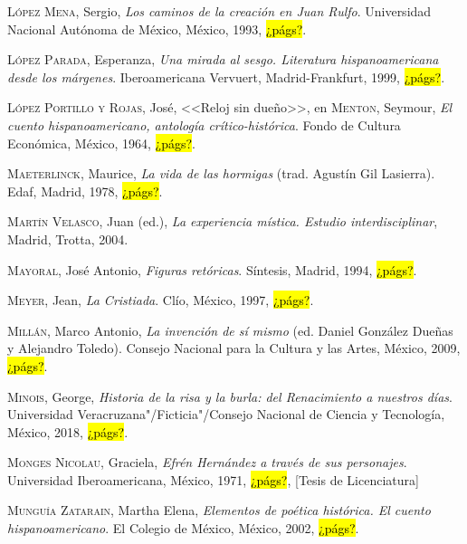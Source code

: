 \documentclass[14pt,twoside,final]{extbook} %
\begin{document}
\textsc{López Mena}, Sergio, \emph{Los caminos de la creación en Juan Rulfo}. Universidad Nacional Autónoma de México, México, 1993, \hl{¿págs?}.\label{bib:lopezmena1993}

\textsc{López Parada}, Esperanza, \emph{Una mirada al sesgo. Literatura hispanoamericana desde los márgenes}. Iberoamericana Vervuert, Madrid-Frankfurt, 1999, \hl{¿págs?}.\label{bib:lopezparada1999}

\textsc{López Portillo y Rojas}, José, <<Reloj sin dueño>>, en \textsc{Menton}, Seymour, \emph{El cuento hispanoamericano, antología crítico-histórica}. Fondo de Cultura Económica, México, 1964, \hl{¿págs?}.\label{bib:lopezportillo1964}

\textsc{Maeterlinck}, Maurice, \emph{La vida de las hormigas} (trad. Agustín Gil Lasierra). Edaf, Madrid, 1978, \hl{¿págs?}.\label{bib:maeterlinck1978}

\textsc{Martín Velasco}, Juan (ed.), \emph{La experiencia mística. Estudio interdisciplinar}, Madrid, Trotta, 2004.\label{bib:martin2004}

\textsc{Mayoral}, José Antonio, \emph{Figuras retóricas}. Síntesis, Madrid, 1994, \hl{¿págs?}.\label{bib:mayoral1994}

\textsc{Meyer}, Jean, \emph{La Cristiada}. Clío, México, 1997,  \hl{¿págs?}.\label{bib:meyer1997}

\textsc{Millán}, Marco Antonio, \emph{La invención de sí mismo} (ed. Daniel González Dueñas y Alejandro Toledo). Consejo Nacional para la Cultura y las Artes, México, 2009, \hl{¿págs?}.\label{bib:millan2009}

\textsc{Minois}, George, \emph{Historia de la risa y la burla: del Renacimiento a nuestros días}. Universidad Veracruzana"/Ficticia"/Consejo Nacional de Ciencia y Tecnología, México, 2018, \hl{¿págs?}.\label{bib:minois2018}

\textsc{Monges Nicolau}, Graciela, \emph{Efrén Hernández a través de sus personajes}. Universidad Iberoamericana, México, 1971, \hl{¿págs?}, [Tesis de Licenciatura]\label{bib:monges1971}

\textsc{Munguía Zatarain}, Martha Elena, \emph{Elementos de poética histórica. El cuento hispanoamericano}. El Colegio de México, México, 2002, \hl{¿págs?}.\label{bib:munguia2002}
\end{document}

